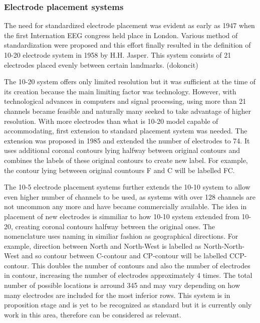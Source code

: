 



\subsubsection{Electrode placement systems}
The need for standardized electrode placement was evident as early as 1947 when
the first Internation EEG congress held place in London. Various method of
standardization were proposed and this effort finally resulted in the definition
of 10-20 electrode system in 1958 by H.H. Jasper. \cite{elSys} 
This system consists of 21 electrodes placed evenly between certain landmarks.
(dokoncit)

The 10-20 system offers only limited resolution but it was sufficient at the
time of its creation because the main limiting factor was technology. However,
with technological advances in computers and signal processing, using more than
21 channels became feasible and naturally many seeked to take advantage of
higher resolution. With more electrodes than what is 10-20 model capable of
accommodating, first extension to standard placement system was needed. The
extension was proposed in 1985 and extended the number of electrodes to 74. It
uses additional coronal contours lying halfway between original contours and
combines the labels of these original contours to create new label.
For example, the contour lying betweeen original countours F and C will be
labelled FC. \cite{elSys}

The 10-5 electrode placement systems further extends the 10-10 system to allow
even higher number of channels to be used, as systems with over 128 channels are
not uncommon any more and have became commercially available. The idea in
placement of new electrodes is simmiliar to how 10-10 system extended from
10-20, creating coronal contours halfway between the original ones. The
nomenclature uses naming in similiar fashion as geographical directions. For
example, direction between North and North-West is labelled as North-North-West
and so contour between C-contour and CP-contour will be labelled CCP-contour.
This doubles the number of contours and also the number of electrodes in
contour, increasing the number of electrodes approximately 4 times. The total
number of possible locations is arround 345 and may vary depending on how many
electrodes are included for the most inferior rows. \cite{elSys} This system is
in proposition stage and is yet to be recognized as standard but it is currently
only work in this area, therefore can be considered as relevant.

